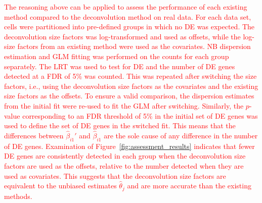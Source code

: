 \documentclass{article}
\newcommand\revised[1]{\textcolor{red}{#1}}
\begin{document}
\revised{The reasoning above can be applied to assess the performance of each existing method compared to the deconvolution method on real data.
For each data set, cells were partitioned into pre-defined groups in which no DE was expected.
The deconvolution size factors was log-transformed and used as offsets, while the log-size factors from an existing method were used as the covariates.
NB dispersion estimation and GLM fitting was performed on the counts for each group separately.
The LRT was used to test for DE and the number of DE genes detected at a FDR of 5\% was counted.
This was repeated after switching the size factors, i.e., using the deconvolution size factors as the covariates and the existing size factors as the offsets.
To ensure a valid comparison, the dispersion estimates from the initial fit were re-used to fit the GLM after switching.
Similarly, the $p$-value corresponding to an FDR threshold of 5\% in the initial set of DE genes was used to define the set of DE genes in the switched fit.
This means that the differences between $\hat\beta_{i1}'$ and $\hat\beta_{i1}$ are the sole cause of any difference in the number of DE genes.
Examination of Figure~\ref{fig:assessment_results} indicates that fewer DE genes are consistently detected in each group when the deconvolution size factors are used as the offsets, relative to the number detected when they are used as covariates.
This suggests that the deconvolution size factors are equivalent to the unbiased estimates $\hat\theta_j$ and are more accurate than the existing methods. 
}
\end{document}

